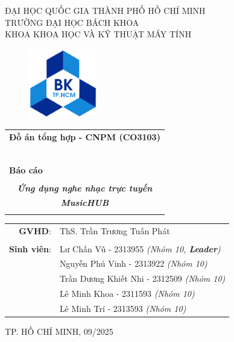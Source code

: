 \documentclass[a4paper]{article}
\begin{document}
\begin{titlepage}
\begin{center}
ĐẠI HỌC QUỐC GIA THÀNH PHỐ HỒ CHÍ MINH\\
TRƯỜNG ĐẠI HỌC BÁCH KHOA\\
KHOA KHOA HỌC VÀ KỸ THUẬT MÁY TÍNH\\
\end{center}

\vspace{1cm}

\begin{figure}[h!]
\begin{center}
\includegraphics[width=3cm]{hcmut.png}
\end{center}
\end{figure}

\vspace{1cm}


\begin{center}
\begin{tabular}{c}
\multicolumn{1}{c}{\textbf{{\Large Đồ án tổng hợp - CNPM (CO3103)}}}\\
~~\\
\hline
\\
\multicolumn{1}{l}{\textbf{{\Large Báo cáo }}}\\
\\
\textbf{\textit{{\Huge Ứng dụng nghe nhạc trực tuyến}}}\vspace{5mm}\\
\textbf{\textit{{\Huge MusicHUB}}}\\
\\
\hline
\end{tabular}
\end{center}

\begin{table}[h]
\centering
    \begin{tabular}{rl}
    \hspace{3 cm}\textbf{GVHD}:
    & ThS. Trần Trương Tuấn Phát\\

    & \\[10pt]
\textbf{Sinh viên}: & Lư Chấn Vũ - 2313955 \emph{(Nhóm 10, \textbf{Leader})} \\
& Nguyễn Phú Vinh - 2313922 \emph{(Nhóm 10)} \\
& Trần Dương Khiết Nhi - 2312509 \emph{(Nhóm 10)} \\
& Lê Minh Khoa - 2311593 \emph{(Nhóm 10)} \\
& Lê Minh Trí - 2313593 \emph{(Nhóm 10)} \\
    \end{tabular}
\end{table}

\begin{center}
{\footnotesize TP. HỒ CHÍ MINH, 09/2025}
\end{center}
\end{titlepage}
\end{document}
